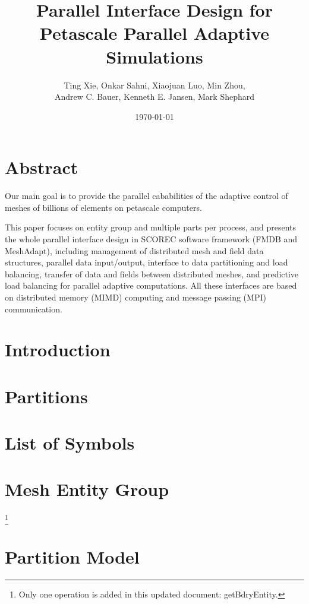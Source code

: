 \documentclass[10pt]{article}
\title{Parallel Interface Design for Petascale Parallel Adaptive Simulations}
\author{Ting Xie, Onkar Sahni, Xiaojuan Luo, Min Zhou,   \\ 
        Andrew C. Bauer, Kenneth E. Jansen, Mark Shephard}
\date{\today}
\begin{document}
\maketitle 

\section{Abstract}

Our main goal is to provide the parallel cababilities of the adaptive
control of meshes of billions of elements on petascale
computers.

This paper focuses on entity group and multiple parts per
process, and presents the whole parallel interface design in
SCOREC software framework (FMDB and MeshAdapt), including management of distributed mesh
and field data structures, parallel data
input/output, interface to data partitioning and
load balancing, transfer of data and fields between 
distributed meshes, and predictive load balancing for parallel
adaptive computations. 
All these interfaces are based on distributed memory (MIMD) computing
and message passing (MPI) communication.  


\section{Introduction}     


\section{Partitions}         


\section{List of Symbols}  


\section{Mesh Entity Group} \footnote{Only one operation is added in
  this updated document: getBdryEntity.}         



 

\section{Partition Model}   
\end{document}
